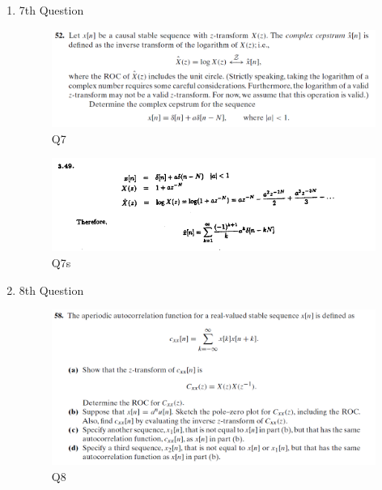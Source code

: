 \documentclass[a4paper,12pt]{article}
\begin{document}
\begin{enumerate}
	\newpage
		
	\item 7th Question
		\begin{figure}[H]
			\center
			\setlength{\unitlength}{\textwidth} 
			\includegraphics[width=1.0\unitlength]{../images/Q12}
			\caption{\label{fig:Q7}Q7 }
		\end{figure}
		
		\begin{figure}[H]
			\center
			\setlength{\unitlength}{\textwidth} 
			\includegraphics[width=1.0\unitlength]{../images/Q12s}
			\caption{\label{fig:Q7s}Q7s }
		\end{figure}
		

	\newpage		
	\item 8th Question
		\begin{figure}[H]
			\center
			\setlength{\unitlength}{\textwidth} 
			\includegraphics[width=1.0\unitlength]{../images/Q13}
			\caption{\label{fig:Q8}Q8 }
		\end{figure}
		

\end{enumerate}
\end{document}
